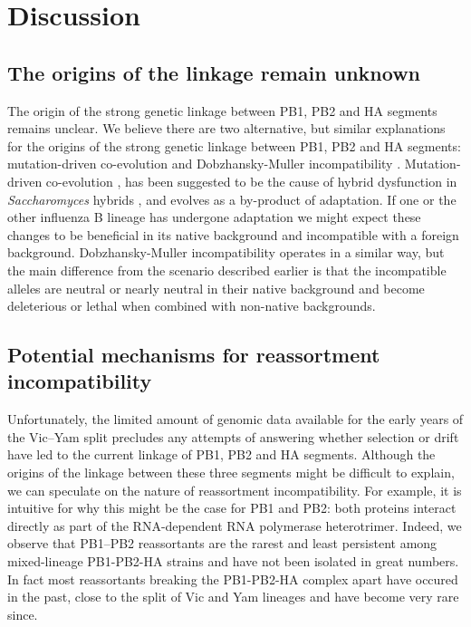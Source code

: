 \documentclass[11pt,oneside,letterpaper]{article}
\begin{document}
\section*{Discussion}

\subsection*{The origins of the linkage remain unknown}
The origin of the strong genetic linkage between PB1, PB2 and HA segments remains unclear.
We believe there are two alternative, but similar explanations for the origins of the strong genetic linkage between PB1, PB2 and HA segments: mutation-driven co-evolution \citep{presgraves2010} and Dobzhansky-Muller incompatibility \citep{dobzhansky1937,muller1942}.
Mutation-driven co-evolution \citep{presgraves2010}, has been suggested to be the cause of hybrid dysfunction in \textit{Saccharomyces} hybrids \citep{lee2008}, and evolves as a by-product of adaptation.
If one or the other influenza B lineage has undergone adaptation we might expect these changes to be beneficial in its native background and incompatible with a foreign background.
Dobzhansky-Muller incompatibility operates in a similar way, but the main difference from the scenario described earlier is that the incompatible alleles are neutral or nearly neutral in their native background and become deleterious or lethal when combined with non-native backgrounds.

\subsection*{Potential mechanisms for reassortment incompatibility}
Unfortunately, the limited amount of genomic data available for the early years of the Vic--Yam split precludes any attempts of answering whether selection or drift have led to the current linkage of PB1, PB2 and HA segments.
Although the origins of the linkage between these three segments might be difficult to explain, we can speculate on the nature of reassortment incompatibility.
For example, it is intuitive for why this might be the case for PB1 and PB2: both proteins interact directly as part of the RNA-dependent RNA polymerase heterotrimer.
Indeed, we observe that PB1--PB2 reassortants are the rarest and least persistent among mixed-lineage PB1-PB2-HA strains and have not been isolated in great numbers.
In fact most reassortants breaking the PB1-PB2-HA complex apart have occured in the past, close to the split of Vic and Yam lineages and have become very rare since.
\end{document}
